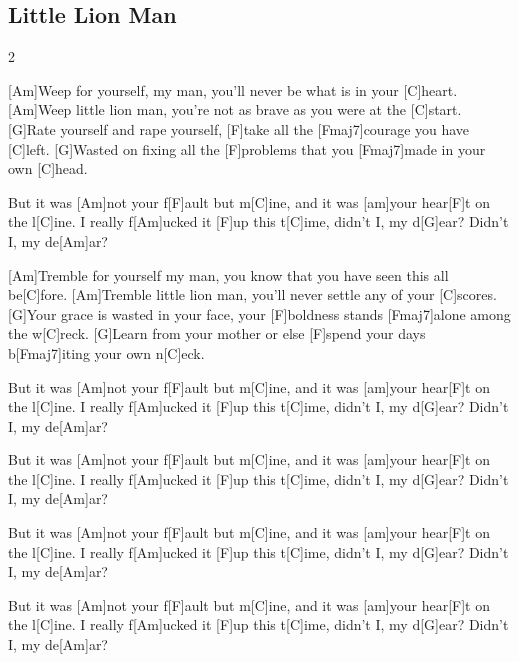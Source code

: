\subsection*{Little Lion Man   }
\begin{guitar}
  \begin{multicols}2{}


[Am]Weep for yourself, my man,
you'll never be what is in your [C]heart.
[Am]Weep little lion man,
you're not as brave as you were at the [C]start.
[G]Rate yourself and rape yourself,
[F]take all the [Fmaj7]courage you have [C]left.
[G]Wasted on fixing all the
[F]problems that you [Fmaj7]made in your own [C]head.



But it was [Am]not your f[F]ault but m[C]ine,
and it was [am]your hear[F]t on the l[C]ine.
I really f[Am]ucked it [F]up this t[C]ime,
didn't I, my d[G]ear?
Didn't I, my de[Am]ar?




[Am]Tremble for yourself my man,
you know that you have seen this all be[C]fore.
[Am]Tremble little lion man,
you'll never settle any of your [C]scores.
[G]Your grace is wasted in your face,
your [F]boldness stands [Fmaj7]alone among the w[C]reck.
[G]Learn from your mother or else
[F]spend your days b[Fmaj7]iting your own n[C]eck.


But it was [Am]not your f[F]ault but m[C]ine,
and it was [am]your hear[F]t on the l[C]ine.
I really f[Am]ucked it [F]up this t[C]ime,
didn't I, my d[G]ear?
Didn't I, my de[Am]ar?



But it was [Am]not your f[F]ault but m[C]ine,
and it was [am]your hear[F]t on the l[C]ine.
I really f[Am]ucked it [F]up this t[C]ime,
didn't I, my d[G]ear?
Didn't I, my de[Am]ar?

\columnbreak








But it was [Am]not your f[F]ault but m[C]ine,
and it was [am]your hear[F]t on the l[C]ine.
I really f[Am]ucked it [F]up this t[C]ime,
didn't I, my d[G]ear?
Didn't I, my de[Am]ar?

But it was [Am]not your f[F]ault but m[C]ine,
and it was [am]your hear[F]t on the l[C]ine.
I really f[Am]ucked it [F]up this t[C]ime,
didn't I, my d[G]ear?
Didn't I, my de[Am]ar?


\end{multicols}
\end{guitar}
